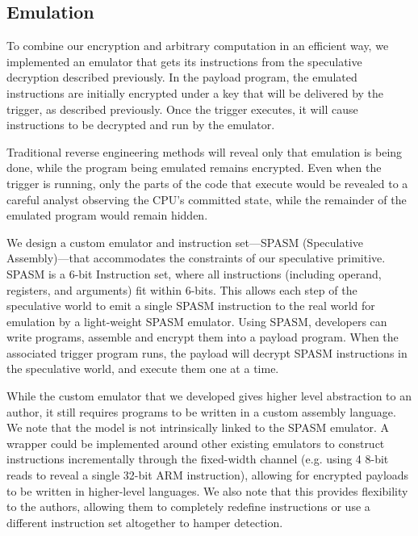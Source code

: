 % 
% 

\subsection{Emulation}

To combine our encryption and arbitrary computation in an efficient way, we
implemented an emulator that gets its instructions from the speculative
decryption described previously. In the payload program, the emulated
instructions are initially encrypted under a key that will be delivered by the
trigger, as described previously. Once the trigger executes, it will cause
instructions to be decrypted and run by the emulator.

Traditional reverse engineering methods will reveal only that
emulation is being done, while the program being emulated remains encrypted.
Even when the trigger is running, only the parts of the code that execute would
be revealed to a careful analyst observing the CPU's committed state, while the
remainder of the emulated program would remain hidden.

We design a custom emulator and instruction set---SPASM (Speculative
Assembly)---that accommodates the constraints of our speculative primitive.
SPASM is a 6-bit Instruction set, where all instructions (including operand,
registers, and arguments) fit within 6-bits. This allows each step of the
speculative world to emit a single SPASM instruction to the real world for
emulation by a light-weight SPASM emulator. Using SPASM, developers can write
programs, assemble and encrypt them into a payload program. When the
associated trigger program runs, the payload will decrypt SPASM instructions in
the speculative world, and execute them one at a time.



While the custom emulator that we developed gives higher level abstraction to
an author, it still requires programs to be written in a custom assembly language. 
We note that the \speculake model is not intrinsically linked to the SPASM emulator. 
A wrapper could be implemented around other existing emulators to construct
instructions incrementally through the fixed-width channel (e.g. using 4 8-bit
reads to reveal a single 32-bit ARM instruction), allowing for encrypted
payloads to be written in higher-level languages. We also note that this
provides flexibility to the authors, allowing them to completely redefine
instructions or use a different instruction set altogether to hamper detection.
